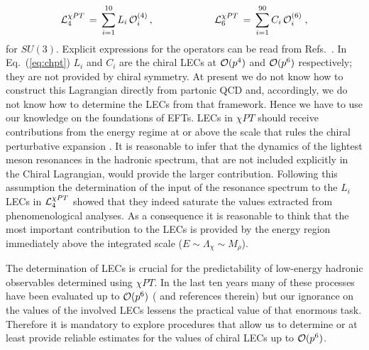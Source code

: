 \documentclass{appolb}
\begin{document}
\begin{eqnarray} \label{eq:chpt}
{\cal L}_4^{\chi PT} \, = \, \sum_{i=1}^{10} L_i \, {\cal O}_i^{(4)} \, , & \; \; \; \; \; \; \; \; \; \; \; \; 
\; \; \;  \; \; \; & \; 
{\cal L}_6^{\chi PT} \, = \, \sum_{i=1}^{90} C_i \, {\cal O}_i^{(6)} \; , 
\end{eqnarray}
for $SU(3)$. Explicit expressions for the operators can be read from Refs.~\cite{Gasser:1984gg,Bijnens:1999sh}. In Eq.~(\ref{eq:chpt}) $L_i$ and $C_i$ are 
the chiral LECs at ${\cal O}(p^4)$ and ${\cal O}(p^6)$ respectively; they are not provided by chiral symmetry.
At present we do not know how to construct this Lagrangian directly from partonic QCD and, accordingly,
we do not know how to determine the LECs from that framework. Hence we have to use our knowledge on the
foundations of EFTs. LECs in $\chi PT$ should receive contributions from the energy regime at or above the scale that rules the chiral perturbative expansion \cite{Georgi:1991ch}. It is reasonable to infer that the 
dynamics of the lightest meson resonances in the hadronic spectrum, that are not included explicitly in the Chiral Lagrangian, would provide the larger contribution. Following this assumption the determination of the input of the resonance spectrum to the $L_i$ LECs in ${\cal L}_4^{\chi PT}$ 
\cite{Ecker:1988te} showed that they indeed saturate the values extracted from phenomenological analyses. 
As a consequence it is reasonable to think that the most important contribution to the LECs is provided by the energy region immediately above the integrated scale ($E \sim \Lambda_{\chi} \sim M_{\rho}$).
\par
The determination of LECs is crucial for the predictability of low-energy hadronic observables determined
using $\chi PT$. In the last ten years many of these processes have been evaluated up to
${\cal O}(p^6)$ (\cite{Bijnens:2006zp} and references therein) but our ignorance on the values of the involved LECs lessens the practical value of that enormous task. Therefore it is mandatory to explore procedures that allow us to 
determine or at least provide reliable estimates for the values of chiral LECs up to ${\cal O}(p^6)$.
\end{document}
